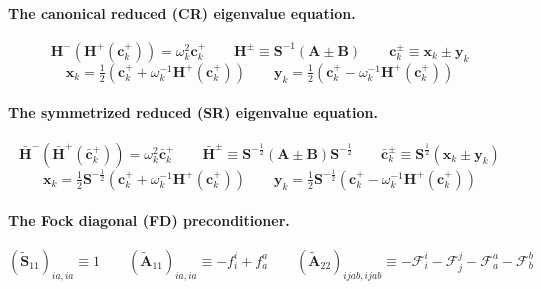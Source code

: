 \paragraph{The canonical reduced (CR) eigenvalue equation.}
\begin{equation}
    \mathbf{H}^-(\mathbf{H}^+(\mathbf{c}_k^+))
    =
    \omega_k^2
    \mathbf{c}_k^+
    \qquad
    \mathbf{H}^{\pm}
    \equiv
    \mathbf{S}^{-1}
    (
        \mathbf{A} \pm \mathbf{B}
    )
    \qquad
    \mathbf{c}_k^{\pm}
    \equiv
    \mathbf{x}_k \pm \mathbf{y}_k
\end{equation}
\begin{equation}
    \mathbf{x}_k
    =
    \tfrac{1}{2}
    (
        \mathbf{c}_k^+
        +
        \omega_k^{-1}
        \mathbf{H}^+(\mathbf{c}_k^+)
    )
    \qquad
    \mathbf{y}_k
    =
    \tfrac{1}{2}
    (
        \mathbf{c}_k^+
        -
        \omega_k^{-1}
        \mathbf{H}^+(\mathbf{c}_k^+)
    )
\end{equation}

\paragraph{The symmetrized reduced (SR) eigenvalue equation.}
\begin{equation}
    \bar{\mathbf{H}}^-(\bar{\mathbf{H}}^+(\bar{\mathbf{c}}_k^+))
    =
    \omega_k^2
    \bar{\mathbf{c}}_k^+
    \qquad
    \bar{\mathbf{H}}^{\pm}
    \equiv
    \mathbf{S}^{-\frac{1}{2}}
    (
        \mathbf{A} \pm \mathbf{B}
    )
    \mathbf{S}^{-\frac{1}{2}}
    \qquad
    \bar{\mathbf{c}}_k^{\pm}
    \equiv
    \mathbf{S}^{\frac{1}{2}}
    (\mathbf{x}_k \pm \mathbf{y}_k)
\end{equation}
\begin{equation}
    \mathbf{x}_k
    =
    \tfrac{1}{2}
    \mathbf{S}^{-\tfrac{1}{2}}
    (
        \mathbf{c}_k^+
        +
        \omega_k^{-1}
        \mathbf{H}^+(\mathbf{c}_k^+)
    )
    \qquad
    \mathbf{y}_k
    =
    \tfrac{1}{2}
    \mathbf{S}^{-\tfrac{1}{2}}
    (
        \mathbf{c}_k^+
        -
        \omega_k^{-1}
        \mathbf{H}^+(\mathbf{c}_k^+)
    )
\end{equation}


\paragraph{The Fock diagonal (FD) preconditioner.}

\begin{equation}
    (\tilde{\mathbf{S}}_{11})_{ia,ia}
    \equiv
    1
    \qquad
    (\tilde{\mathbf{A}}_{11})_{ia,ia}
    \equiv
    -
    f_i^i
    +
    f_a^a
    \qquad
    (\tilde{\mathbf{A}}_{22})_{ijab,ijab}
    \equiv
    -
    \mathcal{F}_i^i
    -
    \mathcal{F}_j^j
    -
    \mathcal{F}_a^a
    -
    \mathcal{F}_b^b
\end{equation}


